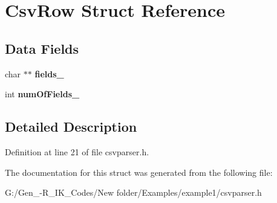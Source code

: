 \hypertarget{struct_csv_row}{}\section{Csv\+Row Struct Reference}
\label{struct_csv_row}
\subsection*{Data Fields}
\begin{DoxyCompactItemize}
\item 
\mbox{\label{struct_csv_row_a7e963d2c7107189e89528fcef40fd54e}} 
char $\ast$$\ast$ {\bfseries fields\+\_\+}
\item 
\mbox{\label{struct_csv_row_a10a8fa7afefe9385109a97d4354d6da6}} 
int {\bfseries num\+Of\+Fields\+\_\+}
\end{DoxyCompactItemize}


\subsection{Detailed Description}


Definition at line 21 of file csvparser.\+h.



The documentation for this struct was generated from the following file\+:\begin{DoxyCompactItemize}
\item 
G\+:/\+Gen\+\_-\/\+R\+\_\+\+I\+K\+\_\+\+Codes/\+New folder/\+Examples/example1/csvparser.\+h\end{DoxyCompactItemize}
